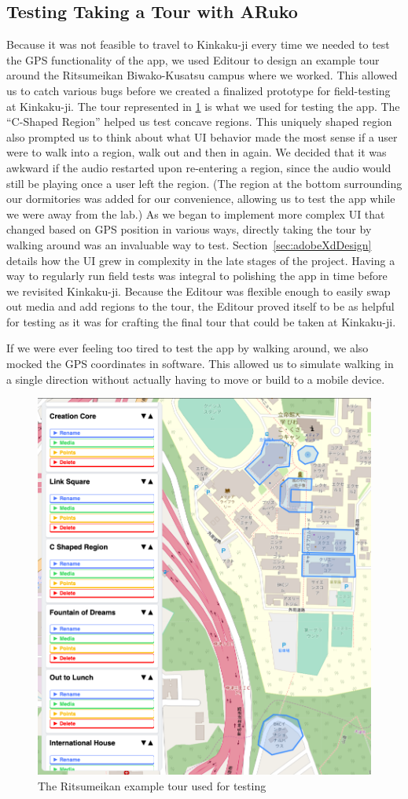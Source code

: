 \documentclass[a4paper, 10pt, american, titlepage]{article}
\begin{document}
\subsection{Testing Taking a Tour with ARuko}
\label{sec:testingARuko}

Because it was not feasible to travel to Kinkaku-ji every time we needed to
test the GPS functionality of the app, we used Editour to design an example
tour around the Ritsumeikan Biwako-Kusatsu campus where we worked. This allowed
us to catch various bugs before we created a finalized prototype for
field-testing at Kinkaku-ji. The tour represented in \ref{fig:ritsuTour} is
what we used for testing the app. The ``C-Shaped Region'' helped us test
concave regions. This uniquely shaped region also prompted us to think about
what UI behavior made the most sense if a user were to walk into a region, walk
out and then in again. We decided that it was awkward if the audio restarted
upon re-entering a region, since the audio would still be playing once a user
left the region. (The region at the bottom surrounding our dormitories was added
for our convenience, allowing us to test the app while we were away from the
lab.) As we began to implement more complex UI that changed based on GPS
position in various ways, directly taking the tour by walking around was an
invaluable way to test. Section~\ref{sec:adobeXdDesign} details how the UI grew
in complexity in the late stages of the project. Having a way to regularly run
field tests was integral to polishing the app in time before we revisited
Kinkaku-ji.  Because the Editour was flexible enough to easily swap out media
and add regions to the tour, the Editour proved itself to be as helpful for
testing as it was for crafting the final tour that could be taken at
Kinkaku-ji.

If we were ever feeling too tired to test the app by walking around, we also
mocked the GPS coordinates in software. This allowed us to simulate walking in
a single direction without actually having to move or build to a mobile device.

\begin{figure}[h]
	\centering
	\includegraphics[width=.5\textwidth]{ritsu-tour.png}
	\caption{The Ritsumeikan example tour used for testing}
	\label{fig:ritsuTour}
\end{figure}
\end{document}
